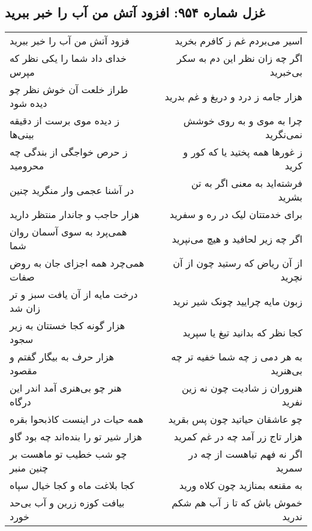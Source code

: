 \begin{center}
\section*{غزل شماره ۹۵۴: افزود آتش من آب را خبر ببرید}
\label{sec:0954}
\begin{longtable}{l p{0.5cm} r}
فزود آتش من آب را خبر ببرید
&&
اسیر می‌بردم غم ز کافرم بخرید
\\
خدای داد شما را یکی نظر که مپرس
&&
اگر چه زان نظر این دم به سکر بی‌خبرید
\\
طراز خلعت آن خوش نظر چو دیده شود
&&
هزار جامه ز درد و دریغ و غم بدرید
\\
ز دیده موی برست از دقیقه بینی‌ها
&&
چرا به موی و به روی خوشش نمی‌نگرید
\\
ز حرص خواجگی از بندگی چه محرومید
&&
ز غورها همه پختید یا که کور و کرید
\\
در آشنا عجمی وار منگرید چنین
&&
فرشته‌اید به معنی اگر به تن بشرید
\\
هزار حاجب و جاندار منتظر دارید
&&
برای خدمتتان لیک در ره و سفرید
\\
همی‌پرد به سوی آسمان روان شما
&&
اگر چه زیر لحافید و هیچ می‌نپرید
\\
همی‌چرد همه اجزای جان به روض صفات
&&
از آن ریاض که رستید چون از آن نچرید
\\
درخت مایه از آن یافت سبز و تر زان شد
&&
زبون مایه چرایید چونک شیر نرید
\\
هزار گونه کجا خستتان به زیر سجود
&&
کجا نظر که بدانید تیغ یا سپرید
\\
هزار حرف به بیگار گفتم و مقصود
&&
به هر دمی ز چه شما خفیه تر چه بی‌هنرید
\\
هنر چو بی‌هنری آمد اندر این درگاه
&&
هنروران ز شادیت چون نه زین نفرید
\\
همه حیات در اینست کاذبحوا بقره
&&
چو عاشقان حیاتید چون پس بقرید
\\
هزار شیر تو را بنده‌اند چه بود گاو
&&
هزار تاج زر آمد چه در غم کمرید
\\
چو شب خطیب تو ماهست بر چنین منبر
&&
اگر نه فهم تباهست از چه در سمرید
\\
کجا بلاغت ماه و کجا خیال سپاه
&&
به مقنعه بمنازید چون کلاه ورید
\\
بیافت کوزه زرین و آب بی‌حد خورد
&&
خموش باش که تا ز آب هم شکم ندرید
\\
\end{longtable}
\end{center}
